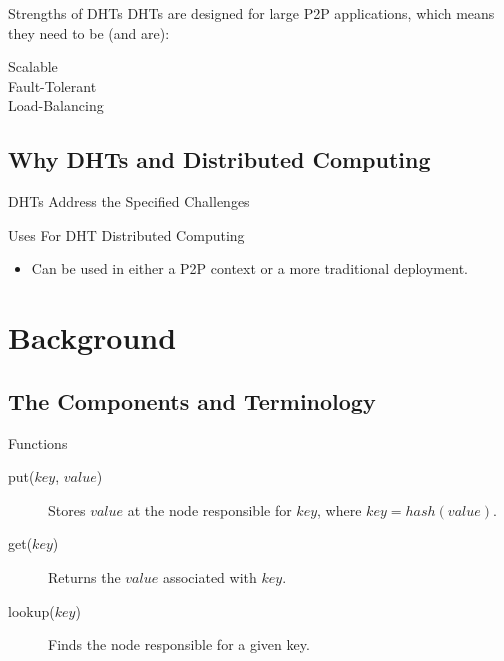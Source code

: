 \documentclass[11pt,aspectratio=169]{beamer}
\begin{document}
\begin{frame}{Strengths of DHTs }
	DHTs are designed for large P2P applications, which means they need to be (and are):
	\begin{description}
		\item[Scalable]
		\item[Fault-Tolerant]
		\item[Load-Balancing]
	\end{description}
	
\end{frame}


\subsection{Why DHTs and Distributed Computing}

\begin{frame}{DHTs Address the Specified Challenges}
\end{frame}

\begin{frame}{Uses For DHT Distributed Computing}
	\begin{itemize}
		\item Can be used in either a P2P context or a more traditional deployment.
	\end{itemize}
\end{frame}


\section{Background}

\subsection{The Components and Terminology}
\begin{frame}{Functions}
	\begin{description}
		\item[put($ key $, $ value $)] Stores $value$ at the node responsible for $key$, where $key =  hash(value)$.
		\item[get($ key $)] Returns the $ value $ associated with $key$.
		\item[lookup($ key $)] Finds the node responsible for a given key.
	\end{description}
\end{frame}
\end{document}
